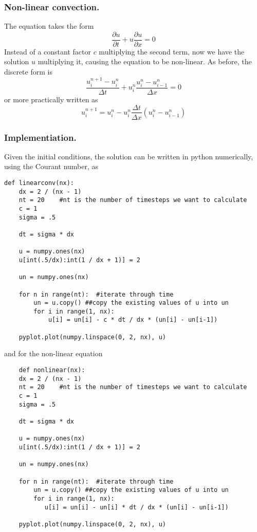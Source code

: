 \documentclass[../../../main.tex]{subfiles}
\begin{document}
\subsubsection{Non-linear convection.}
The equation takes the form
\begin{equation*}
    \frac{\partial u}{\partial t} + u \frac{\partial u}{\partial x} = 0
\end{equation*}
Instead of a constant factor $c$ multiplying the second term, now we have the solution $u$ multiplying it, causing the equation to be non-linear.
As before, the discrete form is
\begin{equation*}
    \frac{u_i^{n+1}-u_i^n}{\Delta t} + u_i^n \frac{u_i^n-u_{i-1}^n}{\Delta x} = 0
\end{equation*}
or more practically written as
\begin{equation*}
    u_i^{n+1} = u_i^n - u_i^n \frac{\Delta t}{\Delta x} (u_i^n - u_{i-1}^n)
\end{equation*}

\subsubsection*{Implementiation.}
Given the initial conditions, the solution can be written in python numerically, using the Courant number, as
\begin{verbatim}
def linearconv(nx):
    dx = 2 / (nx - 1)
    nt = 20    #nt is the number of timesteps we want to calculate
    c = 1
    sigma = .5
    
    dt = sigma * dx

    u = numpy.ones(nx) 
    u[int(.5/dx):int(1 / dx + 1)] = 2

    un = numpy.ones(nx)

    for n in range(nt):  #iterate through time
        un = u.copy() ##copy the existing values of u into un
        for i in range(1, nx):
            u[i] = un[i] - c * dt / dx * (un[i] - un[i-1])
        
    pyplot.plot(numpy.linspace(0, 2, nx), u)
\end{verbatim}
and for the non-linear equation
\begin{verbatim}
    def nonlinear(nx):
    dx = 2 / (nx - 1)
    nt = 20    #nt is the number of timesteps we want to calculate
    c = 1
    sigma = .5
    
    dt = sigma * dx

    u = numpy.ones(nx) 
    u[int(.5/dx):int(1 / dx + 1)] = 2

    un = numpy.ones(nx)

    for n in range(nt):  #iterate through time
        un = u.copy() ##copy the existing values of u into un
        for i in range(1, nx):
           u[i] = un[i] - un[i] * dt / dx * (un[i] - un[i-1]) 
        
    pyplot.plot(numpy.linspace(0, 2, nx), u)
\end{verbatim}
\end{document}
